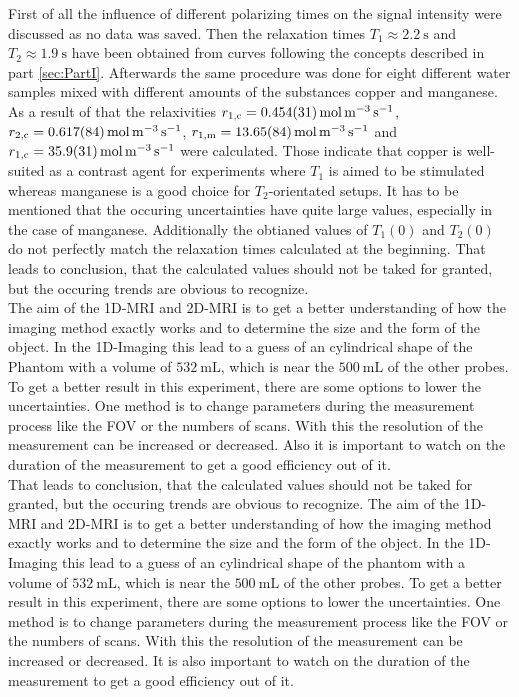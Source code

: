 First of all the influence of different polarizing times on the signal intensity were discussed as no data was saved. Then the relaxation times $T_1 \approx \SI{2.2}{\second}$ and $T_2 \approx \SI{1.9}{\second}$ have been obtained from curves following the concepts described in part \ref{sec:PartI}. Afterwards the same procedure was done for eight different water samples mixed with different amounts of the substances copper and manganese. As a result of that the relaxivities $r_{\text{1,c}} = \SI{0.454 \pm 0.031}{\mole \per \metre \tothe{3} \per \second}$, $r_{\text{2,c}} = \SI{0.617 \pm 0.084}{\mole \per \metre \tothe{3} \per \second}$, $r_{\text{1,m}} = \SI{13.65 \pm 0.84}{\mole \per \metre \tothe{3} \per \second}$ and $r_{\text{1,c}} = \SI{35.9 \pm 3.1}{\mole \per \metre \tothe{3} \per \second}$ were calculated. 
Those indicate that copper is well-suited as a contrast agent for experiments where $T_1$ is aimed to be stimulated whereas manganese is a good choice for $T_2$-orientated setups.
It has to be mentioned that the occuring uncertainties have quite large values, especially in the case of manganese.
Additionally the obtianed values of $T_1(0)$ and $T_2(0)$ do not perfectly match the relaxation times calculated at the beginning.
That leads to conclusion, that the calculated values should not be taked for granted, but the occuring trends are obvious to recognize.\\
The aim of the 1D-MRI and 2D-MRI is to get a better understanding of how the imaging method exactly works and to determine the size and the form of the object. In the 1D-Imaging this lead to a guess of an cylindrical shape of the Phantom with a volume of $\SI{532}{\milli\liter}$, which is near the $\SI{500}{\milli\liter}$ of the other probes. To get a better result in this experiment, there are some options to lower the uncertainties. One method is to change parameters during the measurement process like the FOV or the numbers of scans. With this the resolution of the measurement can be increased or decreased. Also it is important to watch on the duration of the measurement to get a good efficiency out of it. \\
That leads to conclusion, that the calculated values should not be taked for granted, but the occuring trends are obvious to recognize.
The aim of the 1D-MRI and 2D-MRI is to get a better understanding of how the imaging method exactly works and to determine the size and the form of the object. In the 1D-Imaging this lead to a guess of an cylindrical shape of the phantom with a volume of $\SI{532}{\milli\liter}$, which is near the $\SI{500}{\milli\liter}$ of the other probes. To get a better result in this experiment, there are some options to lower the uncertainties. One method is to change parameters during the measurement process like the FOV or the numbers of scans. With this the resolution of the measurement can be increased or decreased. It is also important to watch on the duration of the measurement to get a good efficiency out of it. \\
